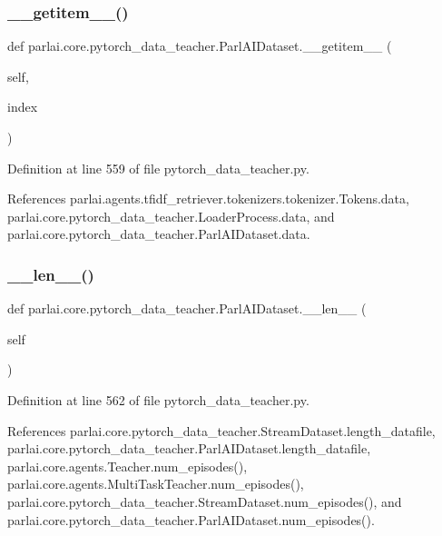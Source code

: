 \subsubsection{\texorpdfstring{\+\_\+\+\_\+getitem\+\_\+\+\_\+()}{\_\_getitem\_\_()}}
{\footnotesize\ttfamily def parlai.\+core.\+pytorch\+\_\+data\+\_\+teacher.\+Parl\+A\+I\+Dataset.\+\_\+\+\_\+getitem\+\_\+\+\_\+ (\begin{DoxyParamCaption}\item[{}]{self,  }\item[{}]{index }\end{DoxyParamCaption})}



Definition at line 559 of file pytorch\+\_\+data\+\_\+teacher.\+py.



References parlai.\+agents.\+tfidf\+\_\+retriever.\+tokenizers.\+tokenizer.\+Tokens.\+data, parlai.\+core.\+pytorch\+\_\+data\+\_\+teacher.\+Loader\+Process.\+data, and parlai.\+core.\+pytorch\+\_\+data\+\_\+teacher.\+Parl\+A\+I\+Dataset.\+data.

\mbox{\label{classparlai_1_1core_1_1pytorch__data__teacher_1_1ParlAIDataset_aaead6896e0da8032cef53af977359886}} 
\subsubsection{\texorpdfstring{\+\_\+\+\_\+len\+\_\+\+\_\+()}{\_\_len\_\_()}}
{\footnotesize\ttfamily def parlai.\+core.\+pytorch\+\_\+data\+\_\+teacher.\+Parl\+A\+I\+Dataset.\+\_\+\+\_\+len\+\_\+\+\_\+ (\begin{DoxyParamCaption}\item[{}]{self }\end{DoxyParamCaption})}



Definition at line 562 of file pytorch\+\_\+data\+\_\+teacher.\+py.



References parlai.\+core.\+pytorch\+\_\+data\+\_\+teacher.\+Stream\+Dataset.\+length\+\_\+datafile, parlai.\+core.\+pytorch\+\_\+data\+\_\+teacher.\+Parl\+A\+I\+Dataset.\+length\+\_\+datafile, parlai.\+core.\+agents.\+Teacher.\+num\+\_\+episodes(), parlai.\+core.\+agents.\+Multi\+Task\+Teacher.\+num\+\_\+episodes(), parlai.\+core.\+pytorch\+\_\+data\+\_\+teacher.\+Stream\+Dataset.\+num\+\_\+episodes(), and parlai.\+core.\+pytorch\+\_\+data\+\_\+teacher.\+Parl\+A\+I\+Dataset.\+num\+\_\+episodes().

